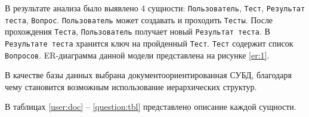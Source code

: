 В результате анализа было выявлено 4 сущности: \texttt{Пользователь}, \texttt{Тест}, \texttt{Результат теста}, \texttt{Вопрос}.
\texttt{Пользователь} может создавать и проходить \texttt{Тесты}. После прохождения \texttt{Теста}, \texttt{Пользователь} получает новый \texttt{Результат теста}. В \texttt{Результате теста} хранится ключ на пройденный \texttt{Тест}. \texttt{Тест} содержит список \texttt{Вопросов}. ER-диаграмма данной модели представлена на рисунке \ref{er:1}.
\begin{figure}[ht!]
\end{figure}

В качестве базы данных выбрана документоориентированная СУБД, благодаря чему становится возможным использование иерархических структур.

В таблицах \ref{user:doc} -- \ref{question:tbl} представлено описание каждой сущности.

